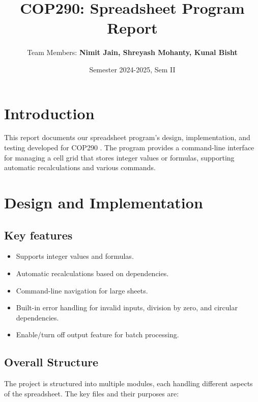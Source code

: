 \documentclass[a4paper,12pt,oneside]{article}
\title{COP290: Spreadsheet Program Report}
\author{Team Members: \textbf{Nimit Jain, Shreyash Mohanty, Kunal Bisht}}
\date{Semester 2024-2025, Sem II}
\begin{document}
\maketitle

\section{Introduction}
This report documents our spreadsheet program's design, implementation, and testing developed for COP290 . The program provides a command-line interface for managing a cell grid that stores integer values or formulas, supporting automatic recalculations and various commands.

\section{Design and Implementation}

\subsection{Key features }

\begin{itemize}
    \item Supports integer values and formulas.
    \item Automatic recalculations based on dependencies.
    \item Command-line navigation for large sheets.
    \item Built-in error handling for invalid inputs, division by zero, and circular dependencies.
    \item Enable/turn off output feature for batch processing.
\end{itemize}

\subsection{Overall Structure}
The project is structured into multiple modules, each handling different aspects of the spreadsheet. The key files and their purposes are:
\end{document}
